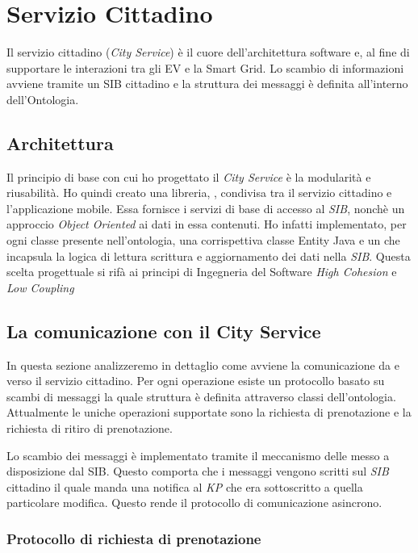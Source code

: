 \chapter{Servizio Cittadino}

Il servizio cittadino (\emph{City Service}) è il cuore dell'architettura software e, al fine di supportare le interazioni tra gli EV e la Smart Grid. Lo scambio di informazioni avviene tramite un SIB cittadino e la struttura dei messaggi è definita all'interno dell'Ontologia. 

\section{Architettura}

Il principio di base con cui ho progettato il \emph{City Service} è la modularità e riusabilità. Ho quindi creato una libreria, , condivisa tra il servizio cittadino e l'applicazione mobile. Essa fornisce i servizi di base di accesso al \emph{SIB}, nonchè un approccio \emph{Object Oriented} ai dati in essa contenuti. Ho infatti implementato, per ogni classe presente nell'ontologia, una corrispettiva classe Entity Java e un  che incapsula la logica di lettura scrittura e aggiornamento dei dati nella \emph{SIB}. Questa scelta progettuale si rifà ai principi di Ingegneria del Software \emph{High Cohesion} e \emph{Low Coupling} \cite{larcab2005}

\section{La comunicazione con il City Service}\label{sec:protocol}

In questa sezione analizzeremo in dettaglio come avviene la comunicazione da e verso il servizio cittadino. Per ogni operazione esiste un protocollo basato su scambi di messaggi la quale struttura è definita attraverso classi dell'ontologia. Attualmente le uniche operazioni supportate sono la richiesta di prenotazione e la richiesta di ritiro di prenotazione.

Lo scambio dei messaggi è implementato tramite il meccanismo delle  messo a disposizione dal SIB. Questo comporta che i messaggi vengono scritti sul \emph{SIB} cittadino il quale manda una notifica al \emph{KP} che era sottoscritto a quella particolare modifica. Questo rende il protocollo di comunicazione asincrono.


\subsection{Protocollo di richiesta di prenotazione}

